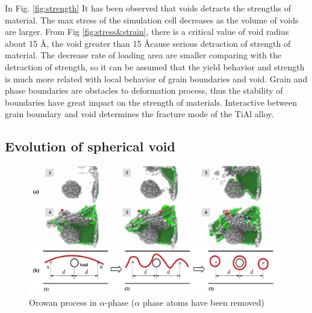\documentclass[metals,article,submit,moreauthors,pdftex,10pt,a4paper]{Definitions/mdpi}
\begin{document}
In Fig. \ref{fig:strength} It has been observed that voids detracts the strengths of  material. The max stress  of the simulation cell decreases as the volume of voids are larger. From Fig \ref{fig:stress&strain}, there is a critical value of void radius about 15 \AA, the void greater than 15 \AA cause serious detraction of strength of material.  The decrease rate of loading area are smaller comparing with the detraction of strength, so it can be assumed that the  yield behavior and strength is much more related with local behavior of grain boundaries and void. Grain and phase boundaries are obstacles to deformation process, thus the stability of boundaries have great impact on the strength of materials. Interactive between grain boundary and void determines the fracture mode of the TiAl alloy.

\subsection{Evolution of spherical void}

\begin{figure}[ht]
	\centering
	\includegraphics[width=1\linewidth]{"img/orowan"}
	\caption{Orowan process in $\alpha$-phase ($\alpha$ phase atoms have been removed)}
	\label{fig:orowan}
\end{figure}
\end{document}
